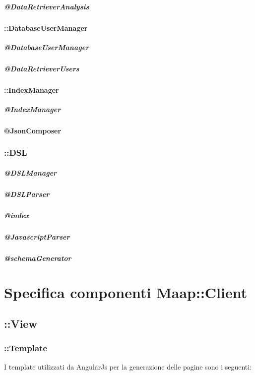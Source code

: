 \subparagraph{@DataRetrieverAnalysis}

\paragraph{::DatabaseUserManager}
\subparagraph{@DatabaseUserManager}
\subparagraph{@DataRetrieverUsers}

\paragraph{::IndexManager}
\subparagraph{@IndexManager}

\paragraph{@JsonComposer}

\subsubsection{::DSL}
\subparagraph{@DSLManager}
\subparagraph{@DSLParser}
\subparagraph{@index}
\subparagraph{@JavascriptParser}
\subparagraph{@schemaGenerator}

\section{Specifica componenti Maap::Client}

\subsection{::View}

\subsubsection{::Template}
I template utilizzati da AngularJs per la generazione delle pagine sono i seguenti:

